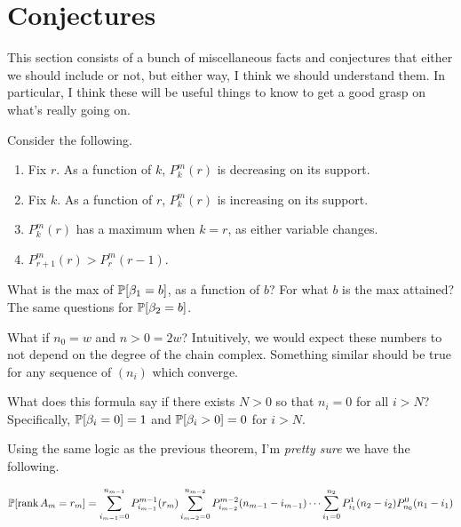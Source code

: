 \section{Conjectures}
This section consists of a bunch of miscellaneous facts and conjectures that
either we should include or not, but either way, I think we should understand
them. In particular, I think these will be useful things to know to get a good
grasp on what's really going on. 

\begin{conjecture}
 Consider the following.
  \begin{enumerate}
    \item Fix $r$. As a function of $k$, $P^m_k(r)$ is decreasing on its support.
    \item Fix $k$. As a function of $r$, $P^m_k(r)$ is increasing on its support.
    \item $P^m_k(r)$ has a maximum when $k = r$, as either variable changes.
    \item $P^m_{r+1}(r) > P^m_r(r-1)$.
  \end{enumerate}
\end{conjecture}

\begin{question} 
  What is the max of $\mathbb{P}[\beta_1=b]$, as a function of $b$? For
  what $b$ is the max attained? The same questions for $\mathbb{P}[\beta_2=b]$.
\end{question}

\begin{question}
  What if $n_0 = w$ and $n>0 = 2w$? Intuitively, we would expect these numbers
  to not depend on the degree of the chain complex. Something similar should
  be true for any sequence of $(n_i)$ which converge.
\end{question}

\begin{question}
  What does this formula say if there exists $N >0$ so that $n_i=0$ for 
  all $i > N$? Specifically, $\mathbb{P}[\beta_i=0] = 1$ and $\mathbb{P}[\beta_i > 0]= 0$ 
  for $i>N$.
\end{question}

Using the same logic as the previous theorem, I'm {\em pretty sure} we have
the following.

\begin{conjecture}
  \[
    \mathbb{P}[\operatorname{\mathrm{rank}} A_m = r_m] = \sum_{i_{m-1}=0}^{n_{m-1}} P^{m-1}_{i_{m-1}}(r_m)
    \sum_{i_{m-2} = 0}^{n_{m-2}} P^{m-2}_{i_{m-2}}(n_{m-1}- i_{m-1})
    \cdots \sum_{i_1 = 0}^{n_2}P^1_{i_1}(n_2-i_2) P^0_{n_0}(n_1-i_1)
  \]
\end{conjecture}


